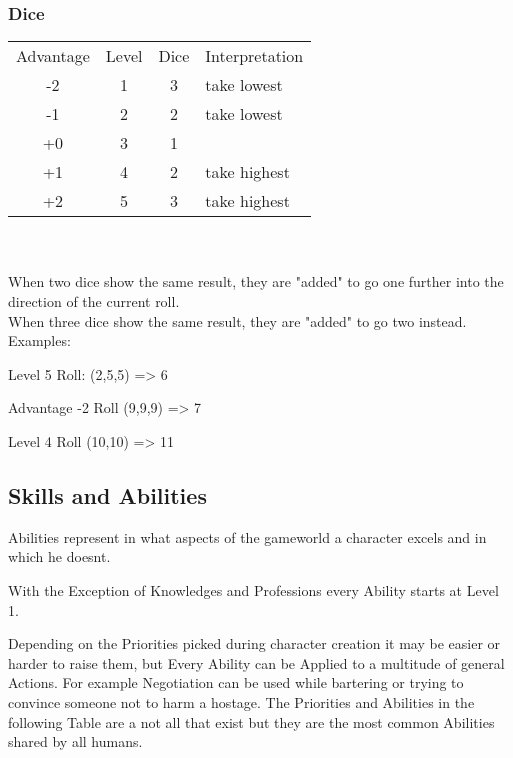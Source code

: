 \documentclass{article}
\begin{document}
    \subsubsection{Dice}
    \begin{tabular}{c|c|c|l}
        Advantage & Level & Dice & Interpretation \\
        -2& 1& 3& take lowest\\
        \hline
        -1& 2& 2& take lowest\\
        \hline
        +0& 3& 1&\\
        \hline
        +1& 4& 2& take highest\\
        \hline
        +2& 5& 3& take highest\\
    \end{tabular}\\
    \vspace{2cm}\\
    When two dice show the same result, they are "added" to go one further into the direction of the current roll.\\
    When three dice show the same result, they are "added" to go two instead.\\
    Examples: \par
    Level 5 Roll: (2,5,5) => 6 \par
    Advantage -2 Roll (9,9,9) => 7 \par
    Level 4 Roll (10,10) => 11 \par

    \subsection{Skills and Abilities}
    Abilities represent in what aspects of the gameworld a character excels and in which he doesnt.

    With the Exception of Knowledges and Professions every Ability starts at Level 1. \par
    Depending on the Priorities picked during character creation it may be easier or harder to raise them, but Every
    Ability can be Applied to a multitude of general Actions. For example Negotiation can be used while bartering or trying
    to convince someone not to harm a hostage. The Priorities and Abilities in the following Table are a not all that exist
    but they are the most common Abilities shared by all humans.\newline\newline
\end{document}
